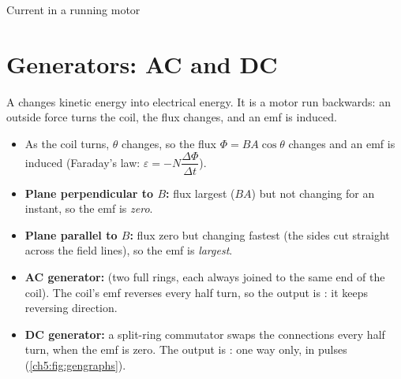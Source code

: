 \begin{formulacard}[notonsheet]{Current in a running motor}
  \begin{symbols}
  \end{symbols}
\end{formulacard}

\section{Generators: AC and DC}\label{ch5:sec:generators}

\begin{bigidea}
A  changes kinetic energy into electrical energy. It is a motor run
backwards: an outside force turns the coil, the flux changes, and an emf is induced.
\end{bigidea}

\begin{itemize}
  \item As the coil turns, $\theta$ changes, so the flux $\Phi = BA\cos\theta$ changes
        and an emf is induced (Faraday's law: $\varepsilon = -N\dfrac{\Delta\Phi}{\Delta t}$).
  \item \textbf{Plane perpendicular to $B$:} flux largest ($BA$) but not changing for an
        instant, so the emf is \emph{zero}.
  \item \textbf{Plane parallel to $B$:} flux zero but changing fastest (the sides cut
        straight across the field lines), so the emf is \emph{largest}.
  \item \textbf{AC generator:}  (two full rings, each always joined to
        the same end of the coil). The coil's emf reverses every half turn, so the
        output is : it keeps reversing direction.
  \item \textbf{DC generator:} a split-ring commutator swaps the connections every half
        turn, when the emf is zero. The output is : one way
        only, in pulses (\cref{ch5:fig:gengraphs}).
\end{itemize}

